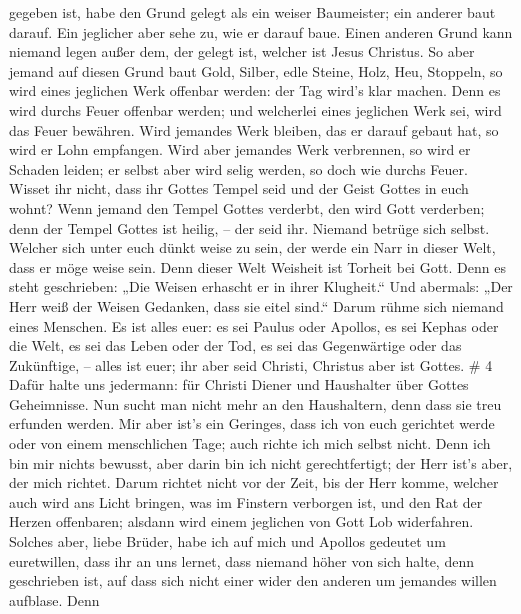 gegeben ist, habe den Grund gelegt als ein weiser Baumeister; ein
anderer baut darauf. Ein jeglicher aber sehe zu, wie er darauf baue.
 Einen anderen Grund kann niemand legen außer dem, der
gelegt ist, welcher ist Jesus Christus.  So aber jemand auf
diesen Grund baut Gold, Silber, edle Steine, Holz, Heu, Stoppeln,
 so wird eines jeglichen Werk offenbar werden: der Tag
wird's klar machen. Denn es wird durchs Feuer offenbar werden; und
welcherlei eines jeglichen Werk sei, wird das Feuer bewähren.
 Wird jemandes Werk bleiben, das er darauf gebaut hat, so
wird er Lohn empfangen.  Wird aber jemandes Werk
verbrennen, so wird er Schaden leiden; er selbst aber wird selig werden,
so doch wie durchs Feuer.  Wisset ihr nicht, dass ihr
Gottes Tempel seid und der Geist Gottes in euch wohnt? 
Wenn jemand den Tempel Gottes verderbt, den wird Gott verderben; denn
der Tempel Gottes ist heilig, -- der seid ihr.  Niemand
betrüge sich selbst. Welcher sich unter euch dünkt weise zu sein, der
werde ein Narr in dieser Welt, dass er möge weise sein. 
Denn dieser Welt Weisheit ist Torheit bei Gott. Denn es steht
geschrieben: „Die Weisen erhascht er in ihrer Klugheit.`` 
Und abermals: „Der Herr weiß der Weisen Gedanken, dass sie eitel sind.``
 Darum rühme sich niemand eines Menschen. Es ist alles
euer:  es sei Paulus oder Apollos, es sei Kephas oder die
Welt, es sei das Leben oder der Tod, es sei das Gegenwärtige oder das
Zukünftige, -- alles ist euer;  ihr aber seid Christi,
Christus aber ist Gottes. \# 4  Dafür halte uns jedermann:
für Christi Diener und Haushalter über Gottes Geheimnisse. 
Nun sucht man nicht mehr an den Haushaltern, denn dass sie treu erfunden
werden.  Mir aber ist's ein Geringes, dass ich von euch
gerichtet werde oder von einem menschlichen Tage; auch richte ich mich
selbst nicht.  Denn ich bin mir nichts bewusst, aber darin
bin ich nicht gerechtfertigt; der Herr ist's aber, der mich richtet.
 Darum richtet nicht vor der Zeit, bis der Herr komme,
welcher auch wird ans Licht bringen, was im Finstern verborgen ist, und
den Rat der Herzen offenbaren; alsdann wird einem jeglichen von Gott Lob
widerfahren.  Solches aber, liebe Brüder, habe ich auf mich
und Apollos gedeutet um euretwillen, dass ihr an uns lernet, dass
niemand höher von sich halte, denn geschrieben ist, auf dass sich nicht
einer wider den anderen um jemandes willen aufblase.  Denn
